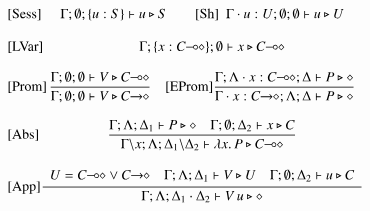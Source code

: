 \begin{figure}[t]
\[
	\begin{array}{lc}
	\trule{Sess}& \hspace{-0.5cm}\Gamma; \emptyset; \set{u:S} \proves u \hastype S 
		\quad\quad 
		\trule{Sh}~~\Gamma \cat u : U; \emptyset; \emptyset \proves u \hastype U
\\[4mm]
	\trule{LVar}& \Gamma; \set{x: \lhot{C}}; \emptyset \proves x \hastype \lhot{C}
		\\[4mm]

		\trule{Prom}&\hspace{-0.5cm} \tree{
			\Gamma; \emptyset; \emptyset \proves V \hastype 
                         \lhot{C}
		}{
			\Gamma; \emptyset; \emptyset \proves V \hastype 
                         \shot{C}
		} 
		\quad
		\trule{EProm}\tree{
		\Gamma; \Lambda \cat x : \lhot{C}; \Delta \proves P \hastype \Proc
		}{
			\Gamma \cat x:\shot{C}; \Lambda; \Delta \proves P \hastype \Proc
		}
		\\[6mm]


		\trule{Abs}&\hspace{-0.5cm} \tree{
			\Gamma; \Lambda; \Delta_1 \proves P \hastype \Proc
			\quad
			\Gamma; \es; \Delta_2 \proves x \hastype C
		}{
			\Gamma\backslash x; \Lambda; \Delta_1 \backslash \Delta_2 \proves \abs{{x}}{P} \hastype \lhot{{C}}
		}
		\\[6mm]

		\trule{App}&\hspace{-0.5cm} \tree{
			\begin{array}{c}
				U = \lhot{C} \lor \shot{C}
				\quad
				\Gamma; \Lambda; \Delta_1 \proves V \hastype U
				\quad
				\Gamma; \es; \Delta_2 \proves u \hastype C
			\end{array}
		}{
			\Gamma; \Lambda; \Delta_1 \cat \Delta_2 \proves \appl{V}{u} \hastype \Proc
		} 
		\\[6mm]



\end{array}\]
\end{figure}
